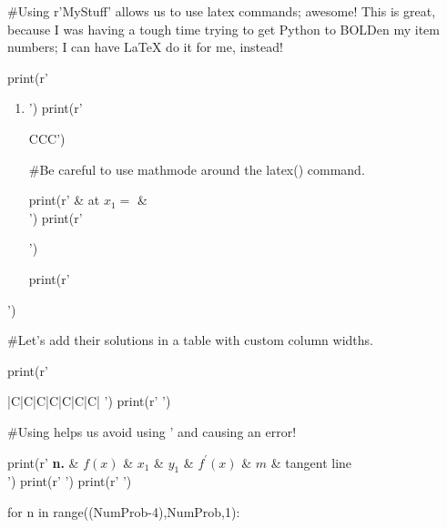 \documentclass[ebook,12pt,oneside,openany]{memoir} %
\begin{document}
\begin{sympycode}

#Using r'MyStuff' allows us to use latex commands; awesome!  This is great, because I was having a tough time trying to get Python to BOLDen my item numbers; I can have LaTeX do it for me, instead!

print(r'\begin{enumerate}')


#Let's BOLDen our item numbers, and start our count at 61 for our preview!

print(r'\renewcommand\labelenumi{\bfseries\theenumi.}')
print(r'\setcounter{enumi}{',(NumProb-4),r'}')


#PYTHON will iterate for us, LATEX will print for us!!!

for n in range((NumProb-4),NumProb,1):
	print(r'\item ')
	print(r' \begin{tabular}{C{\OutColWidthMed}C{\OutColWidthMed}C{\OutColWidthSml}}')


#Be careful to use mathmode around the latex() command.

	print(r' & at  $x_1=$ &  \\')
	print(r'\end{tabular}')

print(r'\end{enumerate}')


#Let's add their solutions in a table with custom column widths.

print(r' \begin{tabular}{|C{\OutColWidthSml}|C{\OutColWidthMed}|C{\OutColWidthSml}|C{\OutColWidthSml}|C{\OutColWidthMed}|C{\OutColWidthSml}|C{\OutColWidthBig}|} ')
print(r' \hline ')

#Using \prime helps us avoid using ' and causing an error!

print(r'    \textbf{n.}    &     $f(x)$      &    $x_1$       &     $y_1$       &     $f^{\prime}(x)$     &     $m$     &  \vphantom{\resizebox{!}{\ColHeight}{$|$}}    tangent line  \vphantom{\resizebox{!}{\ColHeight}{$|$}}  \\ ')
print(r' \hline ')
print(r' \hline ')


for n in range((NumProb-4),NumProb,1):


\end{tabular}
\end{sympycode}
\end{document}
